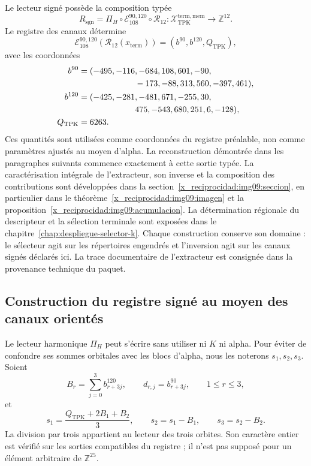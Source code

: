 Le lecteur signé possède la composition typée
\begin{equation}
 R_{\mathrm{sgn}}
 =\Pi_H\circ\mathcal E_{108}^{90,120}\circ\mathcal R_{12}:
 \mathcal X_{\mathrm{TPK}}^{\mathrm{term,mem}}
 \longrightarrow\mathbb Z^{12}.
 \label{x_reciprocidad:eq:k-lector-firmado}
\end{equation}
Le registre des canaux détermine
\[
 \mathcal E_{108}^{90,120}(\mathcal R_{12}(x_{\mathrm{term}}))
 =(b^{90},b^{120},Q_{\mathrm{TPK}}),
\]
avec les coordonnées
\begin{align*}
 b^{90}={}&(-495,-116,-684,108,601,-90,\\
            &\hspace{19mm}-173,-88,313,560,-397,461),\\
 b^{120}={}&(-425,-281,-481,671,-255,30,\\
             &\hspace{19mm}475,-543,680,251,6,-128),\\
 Q_{\mathrm{TPK}}={}&6263.
\end{align*}
Ces quantités sont utilisées comme coordonnées du registre préalable, non
comme paramètres ajustés au moyen d'alpha. La reconstruction démontrée
dans les paragraphes suivants commence exactement à cette sortie typée.
La caractérisation intégrale de l'extracteur, son inverse et la composition
des contributions sont développées dans la section~\ref{x_reciprocidad:img09:seccion},
en particulier dans le théorème~\ref{x_reciprocidad:img09:imagen} et la
proposition~\ref{x_reciprocidad:img09:acumulacion}. La détermination régionale
du descripteur et la sélection terminale sont exposées dans le
chapitre~\ref{chap:despliegue-selector-k}. Chaque construction conserve son
domaine : le sélecteur agit sur les répertoires engendrés et l'inversion
agit sur les canaux signés déclarés ici. La trace documentaire de
l'extracteur est consignée dans la provenance technique du paquet.

\subsection{Construction du registre signé au moyen des canaux orientés}
\label{x_reciprocidad:subsec:k-pi-h}

Le lecteur harmonique \(\Pi_H\) peut s'écrire sans utiliser ni \(K\) ni
alpha. Pour éviter de confondre ses sommes orbitales avec les blocs d'alpha,
nous les noterons \(s_1,s_2,s_3\). Soient
\[
 B_r=\sum_{j=0}^{3}b^{120}_{r+3j},\qquad
 d_{r,j}=b^{90}_{r+3j},\qquad1\leq r\leq3,
\]
et
\begin{equation}
 s_1=\frac{Q_{\mathrm{TPK}}+2B_1+B_2}{3},\qquad
 s_2=s_1-B_1,\qquad s_3=s_2-B_2.
 \label{x_reciprocidad:eq:k-sumas-armonicas}
\end{equation}
La division par trois appartient au lecteur des trois orbites. Son caractère entier est vérifié sur les sorties compatibles du registre ; il n'est pas supposé pour un élément arbitraire de \(\mathbb Z^{25}\).

